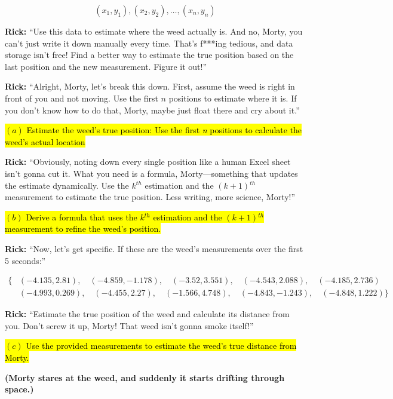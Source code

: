 \documentclass[a4paper, 12pt]{exam}
\begin{document}
\[
(x_1, y_1), (x_2, y_2), \dots, (x_n, y_n)
\]

\noindent \textbf{Rick:} “Use this data to estimate where the weed actually is. And no, Morty, you can’t just write it down manually every time. That’s f***ing tedious, and data storage isn’t free! Find a better way to estimate the true position based on the last position and the new measurement. Figure it out!”

\bigskip

\noindent \textbf{Rick:} “Alright, Morty, let’s break this down. First, assume the weed is right in front of you and not moving. Use the first \(n\) positions to estimate where it is. If you don’t know how to do that, Morty, maybe just float there and cry about it.”

\bigskip
\hl{$(a)$ Estimate the weed's true position: Use the first \textit{n} positions to calculate the weed's actual location}
\bigskip

\noindent \textbf{Rick:} “Obviously, noting down every single position like a human Excel sheet isn’t gonna cut it. What you need is a formula, Morty—something that updates the estimate dynamically. Use the \(k\)$^{th}$ estimation and the \((k+1)\)$^{th}$ measurement to estimate the true position. Less writing, more science, Morty!” \bigskip

\hl{$(b)$ Derive a formula that uses the $k$$^{th}$ estimation and the $(k+1)$$^{th}$ measurement to refine the weed's position.}

\bigskip

\noindent \textbf{Rick:} “Now, let’s get specific. If these are the weed’s measurements over the first 5 seconds:”

\[
\begin{aligned}
\{ 
&(-4.135, 2.81), \quad (-4.859, -1.178), \quad (-3.52, 3.551), \quad (-4.543, 2.088), \quad  (-4.185, 2.736) \\
&(-4.993, 0.269), \quad (-4.455, 2.27), \quad (-1.566, 4.748), \quad (-4.843, -1.243), \quad (-4.848, 1.222)
\}
\end{aligned}
\]

\noindent \textbf{Rick:} “Estimate the true position of the weed and calculate its distance from you. Don’t screw it up, Morty! That weed isn’t gonna smoke itself!”

\bigskip

\hl{$(c)$ Use the provided measurements to estimate the weed's true distance from Morty.}
\bigskip

\noindent \textbf{(Morty stares at the weed, and suddenly it starts drifting through space.)}
\bigskip
\end{document}
